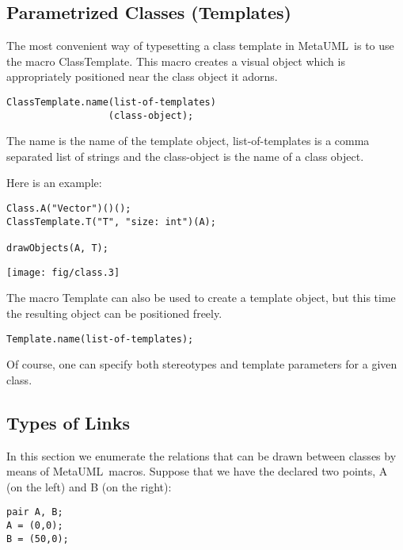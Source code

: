 \documentclass{article}
\newcommand{\code}{\ttfamily}
\newcommand{\metauml}{MetaUML}
\begin{document}
\subsection{Parametrized Classes (Templates)}

The most convenient way of typesetting a class template in \metauml\ is to use the macro {\code ClassTemplate}.
This macro creates a visual object which is appropriately positioned near the class object it adorns.

\begin{verbatim}
ClassTemplate.name(list-of-templates)
                  (class-object);
\end{verbatim}

The {\code name} is the name of the template object, {\code list-of-templates} is a comma separated list of strings and the {\code class-object} is the name of a class object.

Here is an example:

\begin{multicols}{2}
\begin{verbatim}
Class.A("Vector")()();
ClassTemplate.T("T", "size: int")(A);

drawObjects(A, T);
\end{verbatim}
\columnbreak
\hspace{1cm}\texttt{[image: fig/class.3]}
\end{multicols}

The macro {\code Template} can also be used to create a template object, but this time the resulting
object can be positioned freely.

\begin{verbatim}
Template.name(list-of-templates);
\end{verbatim}

Of course, one can specify both stereotypes and template parameters for a given class.

\subsection{Types of Links}

In this section we enumerate the relations that can be drawn between classes by means
of \metauml\ macros. Suppose that we have the declared two points, {\code A} (on the left)
and {\code B} (on the right):

\begin{verbatim}
pair A, B;
A = (0,0);
B = (50,0);
\end{verbatim}
\end{document}
